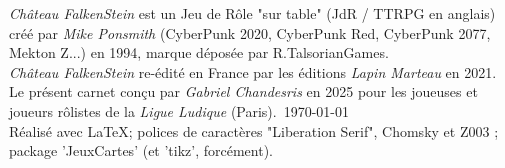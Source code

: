\documentclass[a5paper,french]{article}
\begin{document}
\emph{Château FalkenStein} est un Jeu de Rôle "sur table" (JdR / TTRPG en anglais) créé par \emph{Mike Ponsmith} (CyberPunk 2020, CyberPunk Red, CyberPunk 2077, Mekton Z...) en 1994, marque déposée par R.TalsorianGames.~\\ 
\emph{Château FalkenStein} re-édité en France par les éditions \emph{Lapin Marteau} en 2021.~\\

Le présent carnet conçu par \emph{Gabriel Chandesris} en 2025 pour les joueuses et joueurs rôlistes de la \emph{Ligue Ludique} (Paris).~\today~\\

Réalisé avec \LaTeX ; polices de caractères "Liberation Serif", {\setmainfont{Chomsky} Chomsky } et { \setmainfont{Z003} Z003 } ; package 'JeuxCartes' (et 'tikz', forcément). 
  
\end{document}
